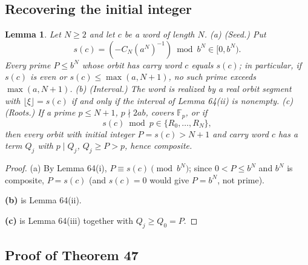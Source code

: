 \documentclass[11pt,reqno]{amsart}
\newtheorem{lemma}[theorem]{Lemma}
\theoremstyle{definition}
\theoremstyle{remark}
\begin{document}
\subsection{Recovering the initial integer}\label{sec:D.3}

\begin{samepage}
\begin{lemma}\leavevmode\label{thm:66}
Let \(N\ge2\) and let \(c\) be a word of length \(N\).
(a) \emph{(Seed.)} Put
\[
s(c)=(-C_N(a^N)^{-1})\bmod b^N\in[0,b^N).
\]
Every
prime \(P\le b^N\) whose orbit has carry word \(c\) equals \(s(c)\); in
particular, if \(s(c)\) is even or \(s(c)\le\max(a,N+1)\), no such
prime exceeds \(\max(a,N+1)\). (b) \emph{(Interval.)} The word is realized by
a real orbit segment with \(\lfloor\xi\rfloor=s(c)\) if and only if the
interval of Lemma 64(ii) is nonempty. (c) \emph{(Roots.)} If a prime
\(p\le N+1\), \(p\nmid2ab\), covers \(\mathbb F_p\), or if
\[
s(c)\bmod p\in\{R_0,\ldots,R_N\},
\]
then every orbit with initial
integer \(P=s(c)>N+1\) and carry word \(c\) has a term \(Q_j\) with
\(p\mid Q_j\), \(Q_j\ge P>p\), hence composite.
\label{thm-end:66}
\end{lemma}
\end{samepage}

\begin{proof}\leavevmode\label{proof:66}
(a) By Lemma 64(i), \(P\equiv s(c)\pmod{b^N}\); since
\(0<P\le b^N\) and \(b^N\) is composite, \(P=s(c)\) (and \(s(c)=0\)
would give \(P=b^N\), not prime).

\textbf{(b)} is Lemma 64(ii).

\textbf{(c)} is Lemma
64(iii) together with \(Q_j\ge Q_0=P\). \qedhere
\end{proof}

\subsection{Proof of Theorem 47}\label{sec:D.4}
\end{document}
